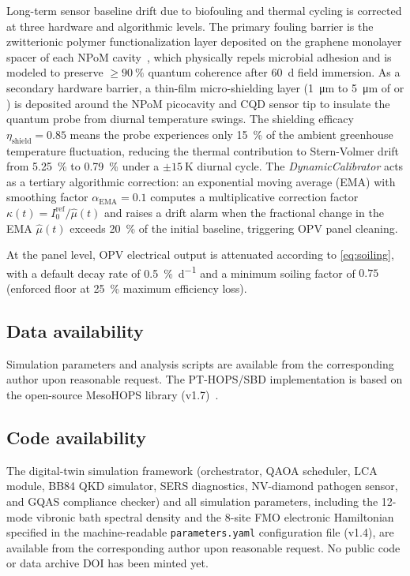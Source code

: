 \documentclass[preprint,12pt]{elsarticle}
\begin{document}
Long-term sensor baseline drift due to biofouling and thermal cycling is corrected at three hardware and algorithmic levels. The primary fouling barrier is the zwitterionic polymer functionalization layer deposited on the graphene monolayer spacer of each NPoM cavity~\cite{Kumar2022,Do2025}, which physically repels microbial adhesion and is modeled to preserve $\geq\qty{90}{\percent}$ quantum coherence after \qty{60}{\day} field immersion. As a secondary hardware barrier, a thin-film micro-shielding layer (\qty{1}{\micro\meter} to \qty{5}{\micro\meter} of  or ) is deposited around the NPoM picocavity and CQD sensor tip to insulate the quantum probe from diurnal temperature swings. The shielding efficacy $\eta_{\mathrm{shield}} = 0.85$ means the probe experiences only \qty{15}{\percent} of the ambient greenhouse temperature fluctuation, reducing the thermal contribution to Stern-Volmer drift from \qty{5.25}{\percent} to \qty{0.79}{\percent} under a $\pm\qty{15}{\K}$ diurnal cycle. The \textit{DynamicCalibrator} acts as a tertiary algorithmic correction: an exponential moving average (EMA) with smoothing factor $\alpha_{\mathrm{EMA}} = 0.1$ computes a multiplicative correction factor $\kappa(t) = I_0^{\mathrm{ref}} / \hat{\mu}(t)$ and raises a drift alarm when the fractional change in the EMA $\hat{\mu}(t)$ exceeds \qty{20}{\percent} of the initial baseline, triggering OPV panel cleaning.

At the panel level, OPV electrical output is attenuated according to \cref{eq:soiling}, with a default decay rate of \qty{0.5}{\percent\per\day} and a minimum soiling factor of $0.75$ (enforced floor at \qty{25}{\percent} maximum efficiency loss).

\subsection*{Data availability}

Simulation parameters and analysis scripts are available from the corresponding author upon reasonable request.
The PT-HOPS/SBD implementation is based on the open-source MesoHOPS library (v1.7)~\cite{Varvelo2021}.

\subsection*{Code availability}
The digital-twin simulation framework (orchestrator, QAOA scheduler, LCA module, BB84 QKD simulator, SERS diagnostics, NV-diamond pathogen sensor, and GQAS compliance checker) and all simulation parameters, including the 12-mode vibronic bath spectral density and the 8-site FMO electronic Hamiltonian specified in the machine-readable \texttt{parameters.yaml} configuration file (v1.4), are available from the corresponding author upon reasonable request. No public code or data archive DOI has been minted yet.
\end{document}
